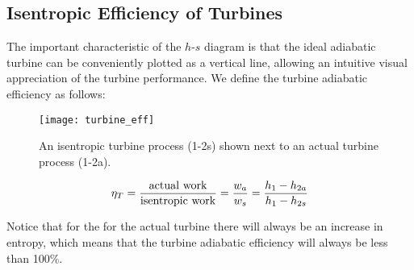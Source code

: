 \subsection{Isentropic Efficiency of Turbines}
The important characteristic of the $h$-$s$ diagram is that the ideal adiabatic turbine can be conveniently plotted as a vertical line, allowing an intuitive visual appreciation of the turbine performance. We define the turbine adiabatic efficiency as follows:
\nopagebreak[4]%
\begin{figure}[H]
  \centering
  \texttt{[image: turbine\_eff]}
  \caption{An isentropic turbine process (1-2s) shown next to an actual turbine process (1-2a).}
  \label{fig:turbine_eff}
\end{figure}
\begin{equation} \label{eq:turbine_eff}
  \eta_T = \frac{\rm actual\ work}{\rm isentropic\ work} = \frac{w_a}{w_s} = \frac{h_1 - h_{2a}}{h_1 - h_{2s}}
\end{equation}

Notice that for the for the actual turbine there will always be an increase in entropy, which means that the turbine adiabatic efficiency will always be less than 100\%.

